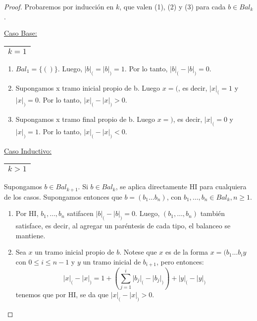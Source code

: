   \begin{proof}
    \PN Probaremos por inducción en $k$, que valen (1), (2) y (3) para cada $b \in Bal_{k}$.

    \vspace{3mm}
    \PN \underline{Caso Base:} \begin{tabular}{|c|} \hline $k = 1$ \\\hline \end{tabular}
    \begin{enumerate}[(1)]
      \item $Bal_{1} = \{()\}$. Luego, $\lvert b \rvert_{(} = \lvert b \rvert_{)} = 1$. Por lo tanto, $\lvert b
       \rvert_{(} - \lvert b \rvert_{)} = 0$.
      \item Supongamos x tramo inicial propio de b. Luego $x = ($, es decir, $\lvert x \rvert_{(} = 1$ y $\lvert x
      \rvert_{)} = 0$. Por lo tanto, $\lvert x \rvert_{(} - \lvert x \rvert_{)} > 0$.
      \item Supongamos x tramo final propio de b. Luego $x = )$, es decir, $\lvert x \rvert_{(} = 0$ y $\lvert x
      \rvert_{)} = 1$. Por lo tanto, $\lvert x \rvert_{(} - \lvert x \rvert_{)} < 0$.
    \end{enumerate}

  	\PN \underline{Caso Inductivo:} \begin{tabular}{|c|} \hline $k > 1$ \\\hline \end{tabular} Supongamos $b \in
    Bal_{k+1}$. Si $b \in Bal_{k}$, se aplica directamente HI para cualquiera de los casos. Supongamos entonces que
    $b = (b_{1} \dotsc b_{n})$, con $b_{1}, \dotsc, b_{n} \in Bal_{k}, n \geq 1$.

    \begin{enumerate}[(1)]
      \item Por HI, $b_{1}, \dotsc, b_{n}$ satifacen $\lvert b \rvert_{(} - \lvert b \rvert_{)} = 0$. Luego, $(b_{1},
        \dotsc, b_{n})$ también satisface, es decir, al agregar un paréntesis de cada tipo, el balanceo se mantiene.

      \item Sea $x$ un tramo inicial propio de $b$. Notese que $x$ es de la forma $x = (b_{1} \dotsc b_{i} y$ con
        $0 \leq i \leq n-1$ y $y$ un tramo inicial de $b_{i+1}$, pero entonces:
        \[
          \lvert x \rvert_{(} - \lvert x \rvert_{)} = 1 + \left(\sum_{j=1}^{i} \lvert b_{j} \rvert_{(} - \lvert b_{j}
          \rvert_{)}\right) + \lvert y \rvert_{(} - \lvert y \rvert_{)}
        \]
      tenemos que por HI, se da que $\lvert x \rvert_{(} - \lvert x \rvert_{)} > 0$.


\end{enumerate}
\end{proof}
